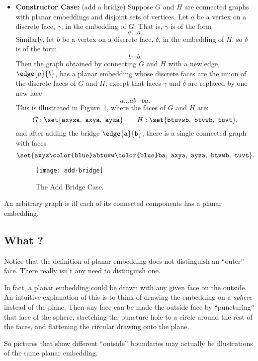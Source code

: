 \begin{definition}
\begin{itemize}
\item \textbf{Constructor Case:} (add a bridge) Suppose $G$ and $H$ are
connected graphs with planar embeddings and disjoint sets of vertices.
Let $a$ be a vertex on a discrete face, $\gamma$, in the embedding of
$G$.  That is, $\gamma$ is of the form
\[
a\dots a.
\]
Similarly, let $b$ be a vertex on a discrete face, $\delta$, in the
embedding of $H$, so $\delta$ is of the form
\[
b\cdots b.
\]
Then the graph obtained by connecting $G$ and $H$ with a new edge,
$\edge{a}{b}$, has a planar embedding whose discrete faces are the union of
the discrete faces of $G$ and $H$, except that faces $\gamma$ and $\delta$
are replaced by one new face
\[
a\dots ab\cdots ba.
\]
This is illustrated in Figure~\ref{fig:add-bridge}, where the faces of
$G$ and $H$ are:
\[
G: \set{\texttt{axyza},\ \texttt{axya},\ \texttt{ayza}}
    \qquad H: \set{\texttt{btuvwb},\ \texttt{btvwb},\ \texttt{tuvt}},
\]
and after adding the bridge $\edge{\texttt{a}}{\texttt{b}}$, there is a
single connected graph with faces
\[
\set{\texttt{axyz{\color{blue}ab}tuvw{\color{blue}ba}},\
         \texttt{axya},\ \texttt{ayza},\ \texttt{btvwb},\ \texttt{tuvt}}.
\]
\begin{figure}[h]
\texttt{[image: add-bridge]}
\caption{The Add Bridge Case.}
\label{fig:add-bridge}
\end{figure}

\end{itemize}

An arbitrary graph is  iff each of its connected components
has a planar embedding.

\end{definition}

\subsection{What ?}
Notice that the definition of planar embedding does not distinguish an
``outer'' face.  There really isn't any need to distinguish one.

In fact, a planar embedding could be drawn with any given face on the
outside.  An intuitive explanation of this is to think of drawing the
embedding on a \emph{sphere} instead of the plane.  Then any face can be
made the outside face by ``puncturing'' that face of the sphere,
stretching the puncture hole to a circle around the rest of the faces,
and flattening the circular drawing onto the plane.

So pictures that show different ``outside'' boundaries may actually be
illustrations of the same planar embedding.

